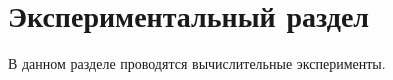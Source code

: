\chapter{Экспериментальный раздел}
\label{cha:research}

В данном разделе проводятся вычислительные эксперименты.



